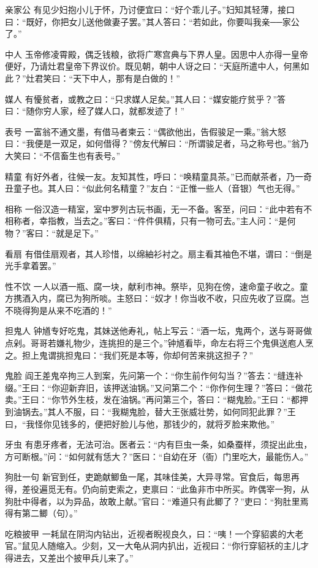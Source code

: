 \documentclass[12pt,UTF8]{ctexbook}
\begin{document}
亲家公
有见少妇抱小儿于怀，乃讨便宜曰：“好个乖儿子。”妇知其轻薄，接口曰：“既好，你把女儿送他做妻子罢。”其人答曰：“若如此，你要叫我亲──家公了。”

中人
玉帝修凌霄殿，偶乏钱粮，欲将广寒宫典与下界人皇。因思中人亦得一皇帝便好，乃请灶君皇帝下界议价。既见朝，朝中人讶之曰：“天庭所遣中人，何黑如此？”灶君笑曰：“天下中人，那有是白做的！”

媒人
有懮贫者，或教之曰：“只求媒人足矣。”其人曰：“媒安能疗贫乎？”答曰：“随你穷人家，经了媒人口，就都发迹了！”

表号
一富翁不通文墨，有借马者柬云：“偶欲他出，告假骏足一乘。”翁大怒曰：“我便是一双足，如何借得？”傍友代解曰：“所谓骏足者，马之称号也。”翁乃大笑曰：“不信畜生也有表号。”

精童
有好外者，往候一友。友知其性，呼曰：“唤精童具茶。”已而献茶者，乃一奇丑童子也。其人曰：“似此何名精童？”友白：“正惟一些人（音银）气也无得。”

相称
一俗汉造一精室，室中罗列古玩书画，无一不备。客至，问曰：“此中若有不相称者，幸指教，当去之。”客曰：“件件俱精，只有一物可去。”主人问：“是何物？”客曰：“就是足下。”

看扇
有借佳扇观者，其人珍惜，以绵紬衫衬之。扇主看其袖色不堪，谓曰：“倒是光手拿着罢。”

性不饮
一人以酒一瓶、腐一块，献利市神。祭毕，见狗在傍，速命童子收之。童方携酒入内，腐已为狗所啖。主怒曰：“奴才！你当收不收，只应先收了豆腐。岂不晓得狗是从来不吃酒的！”

担鬼人
钟馗专好吃鬼，其妹送他寿礼，帖上写云：“酒一坛，鬼两个，送与哥哥做点剁。哥哥若嫌礼物少，连挑担的是三个。”钟馗看毕，命左右将三个鬼俱送庖人烹之。担上鬼谓挑担鬼曰：“我们死是本等，你却何苦来挑这担子？”

鬼脸
阎王差鬼卒拘三人到案，先问第一个：“你生前作何勾当？”答去：“缝连补缀。”王曰：“你迎新弃旧，该押送油锅。”又问第二个：“你作何生理？”答曰：“做花卖。”王曰：“你节外生枝，发在油锅。”再问第三个，答曰：“糊鬼脸。”王曰：“都押到油锅去。”其人不服，曰：“我糊鬼脸，替大王张威壮势，如何同犯此罪？”王曰，“我怪你见钱多的，便把好脸儿与他，那钱少的，就将歹脸来欺他。”

牙虫
有患牙疼者，无法可治。医者云：“内有巨虫一条，如桑蚕样，须捉出此虫，方可断根。”问：“如何就有恁大？”医曰：“自幼在牙（衙）门里吃大，最能伤人。”

狗肚一句
新官到任，吏跪献鲫鱼一尾，其味佳美，大异寻常。官食后，每思再得，差役遍觅无有。仍向前吏索之，吏禀曰：“此鱼非市中所买。昨偶宰一狗，从狗肚中得者，以为异品，故敢上献。”官曰：“难道只有此鲫了？”吏曰：“狗肚里焉得有第二鲫（句）。”

吃粮披甲
一耗鼠在阴沟内钻出，近视者睨视良久，曰：“咦！一个穿貂裘的大老官。”鼠见人随缩入。少刻，又一大龟从洞内扒出，近视曰：“你行穿貂袄的主儿才得进去，又差出个披甲兵儿来了。”
\end{document}
